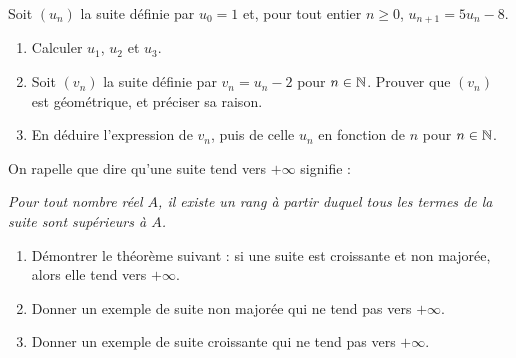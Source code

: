 \documentclass[a4paper,11pt,DIV12,BCOR0mm]{scrartcl}
\begin{document}
\begin{exercice}
Soit $(u_n)$ la suite définie par $u_0=1$ et, pour
tout entier $n\geq0$, $u_{n+1}=5u_n-8$.
\begin{enumerate}
 \item Calculer $u_1$, $u_2$ et $u_3$.
 \item Soit $(v_n)$ la suite définie par $v_n=u_n-2$ pour $n\in\mathbb{N}$. Prouver que $(v_n)$
est géométrique, et préciser sa raison.
 \item En déduire l'expression de $v_n$, puis de celle $u_n$ en fonction de $n$ pour $n\in\mathbb{N}$.
\end{enumerate}
\end{exercice}


\begin{exercice}
 
\end{exercice}

\begin{exercice}[Cours]
 On rapelle que dire qu'une suite tend vers $+\infty$ signifie :

\emph{Pour tout nombre réel $A$, il existe un rang à partir duquel 
tous les termes de la suite sont supérieurs
à $A$.}

\begin{enumerate}
 \item Démontrer le théorème suivant : si une suite est croissante et non majorée, alors elle tend vers $+\infty$.
 \item Donner un exemple de suite non majorée qui ne tend pas vers $+\infty$.
 \item Donner un exemple de suite croissante qui ne tend pas vers $+\infty$.
\end{enumerate}


\end{exercice}
\end{document}
